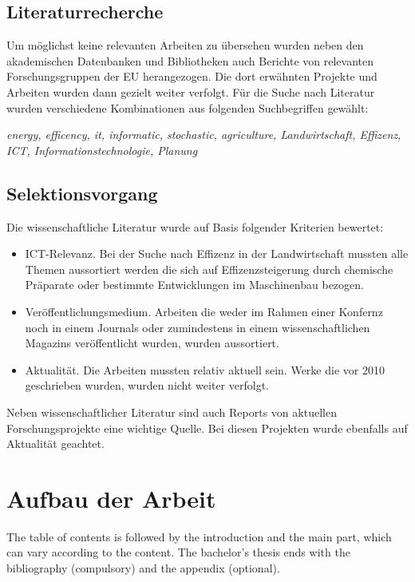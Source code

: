 \subsection{Literaturrecherche}
Um möglichst keine relevanten Arbeiten zu übersehen wurden neben den akademischen Datenbanken und Bibliotheken auch Berichte von relevanten Forschungsgruppen der EU herangezogen. Die dort erwähnten Projekte und Arbeiten wurden dann gezielt weiter verfolgt. Für die Suche nach Literatur wurden verschiedene Kombinationen aus folgenden Suchbegriffen gewählt:

\textit{energy, efficency, it, informatic, stochastic, agriculture, Landwirtschaft, Effizenz, ICT, Informationstechnologie, Planung}

\subsection{Selektionsvorgang}
Die wissenschaftliche Literatur wurde auf Basis folgender Kriterien bewertet:
\begin{itemize}
  \item ICT-Relevanz. Bei der Suche nach Effizenz in der Landwirtschaft mussten alle Themen aussortiert werden die sich auf Effizenzsteigerung durch chemische Präparate oder bestimmte Entwicklungen im Maschinenbau bezogen.
  \item Veröffentlichungsmedium. Arbeiten die weder im Rahmen einer Konfernz noch in einem Journals oder zumindestens in einem wissenschaftlichen Magazins veröffentlicht wurden, wurden aussortiert.
  \item Aktualität. Die Arbeiten mussten relativ aktuell sein. Werke die vor 2010 geschrieben wurden, wurden nicht weiter verfolgt.
\end{itemize}

Neben wissenschaftlicher Literatur sind auch Reports von aktuellen Forschungsprojekte eine wichtige Quelle. Bei diesen Projekten wurde ebenfalls auf Aktualität geachtet.

\section{Aufbau der Arbeit}

The table of contents is followed by the introduction and the main part, which can vary according to the content. The bachelor's thesis ends with the bibliography (compulsory) and the appendix (optional).

